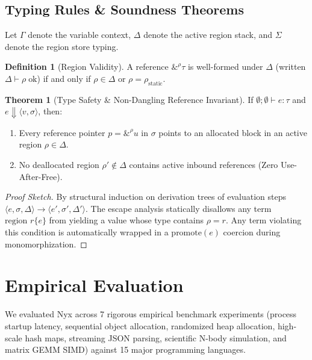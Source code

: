 \documentclass[sigplan,10pt,nonacm]{acmart}
\theoremstyle{definition}
\newtheorem{theorem}{Theorem}
\newtheorem{definition}{Definition}
\begin{document}
\subsection{Typing Rules \& Soundness Theorems}
Let $\Gamma$ denote the variable context, $\Delta$ denote the active region stack, and $\Sigma$ denote the region store typing.

\begin{definition}[Region Validity]
A reference $\&^{\rho} \tau$ is well-formed under $\Delta$ (written $\Delta \vdash \rho \;\text{ok}$) if and only if $\rho \in \Delta$ or $\rho = \rho_{\text{static}}$.
\end{definition}

\begin{theorem}[Type Safety \& Non-Dangling Reference Invariant]
If $\emptyset; \emptyset \vdash e : \tau$ and $e \Downarrow \langle v, \sigma \rangle$, then:
\begin{enumerate}
    \item Every reference pointer $p = \&^{\rho} u$ in $\sigma$ points to an allocated block in an active region $\rho \in \Delta$.
    \item No deallocated region $\rho' \notin \Delta$ contains active inbound references (Zero Use-After-Free).
\end{enumerate}
\end{theorem}

\begin{proof}[Proof Sketch]
By structural induction on derivation trees of evaluation steps $\langle e, \sigma, \Delta \rangle \to \langle e', \sigma', \Delta' \rangle$. The escape analysis statically disallows any term $\text{region } r \{ e \}$ from yielding a value whose type contains $\rho = r$. Any term violating this condition is automatically wrapped in a $\text{promote}(e)$ coercion during monomorphization.
\end{proof}

\section{Empirical Evaluation}
We evaluated Nyx across 7 rigorous empirical benchmark experiments (process startup latency, sequential object allocation, randomized heap allocation, high-scale hash maps, streaming JSON parsing, scientific N-body simulation, and matrix GEMM SIMD) against 15 major programming languages.
\end{document}
